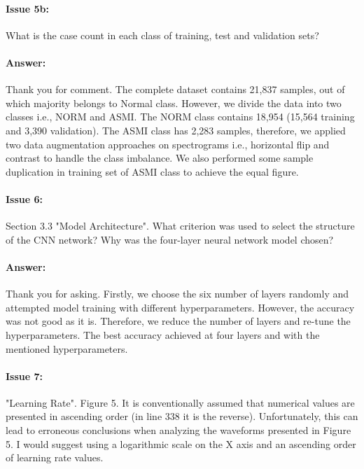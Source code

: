 \documentclass{article}
\begin{document}
\paragraph{Issue 5b:}
\begin{displayquote}
What is the case count in each class of training, test and validation sets?
\end{displayquote}

\paragraph{Answer:}
Thank you for comment. The complete dataset contains 21,837 samples, out of which majority belongs to Normal class. However, we divide the data into two classes i.e., NORM and ASMI. The NORM class contains 18,954 (15,564 training and 3,390 validation). The ASMI class has 2,283 samples, therefore, we applied two data augmentation approaches on spectrograms i.e., horizontal flip and contrast to handle the class imbalance. We also performed some sample duplication in training set of ASMI class to achieve the equal figure.  

\paragraph{Issue 6:}
\begin{displayquote}
Section 3.3 "Model Architecture". What criterion was used to select the structure of the CNN network? Why was the four-layer neural network model chosen?
\end{displayquote}

\paragraph{Answer:}
Thank you for asking. Firstly, we choose the six number of layers randomly and attempted model training with different hyperparameters. However, the accuracy was not good as it is. Therefore, we reduce the number of layers and re-tune the hyperparameters. The best accuracy achieved at four layers and with the mentioned hyperparameters. 

\paragraph{Issue 7:}
\begin{displayquote}
"Learning Rate". Figure 5. It is conventionally assumed that numerical values are presented in ascending order (in line 338 it is the reverse). Unfortunately, this can lead to erroneous conclusions when analyzing the waveforms presented in Figure 5. I would suggest using a logarithmic scale on the X axis and an ascending order of learning rate values. 
\end{displayquote}
\end{document}
